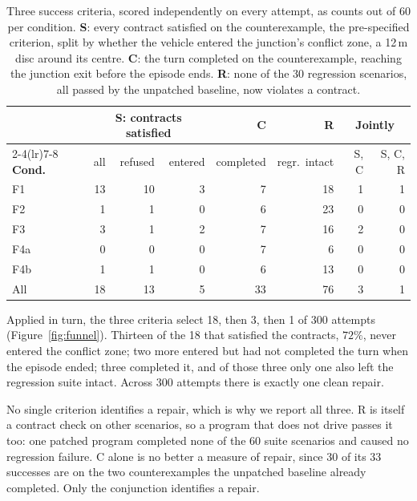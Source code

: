\documentclass{article}
\begin{document}
\begin{table}[t]
\centering
\small
\caption{Three success criteria, scored independently on every attempt, as
counts out of 60 per condition. \textbf{S}: every contract satisfied on the
counterexample, the pre-specified criterion, split by whether the vehicle
entered the junction's conflict zone, a 12\,m disc around its centre.
\textbf{C}: the turn completed on the counterexample, reaching the junction exit
before the episode ends. \textbf{R}: none of the 30 regression scenarios, all
passed by the unpatched baseline, now violates a contract.}
\label{tab:criteria}
\begin{tabular}{@{}lrrrrrrr@{}}
\toprule
& \multicolumn{3}{c}{\textbf{S: contracts satisfied}} & \textbf{C} & \textbf{R} & \multicolumn{2}{c}{\textbf{Jointly}} \\
\cmidrule(lr){2-4}\cmidrule(lr){7-8}
\textbf{Cond.} & all & refused & entered & completed & regr.\ intact & S, C & S, C, R \\
\midrule
F1  & 13 & 10 & 3 & 7 & 18 & 1 & 1 \\
F2  &  1 &  1 & 0 & 6 & 23 & 0 & 0 \\
F3  &  3 &  1 & 2 & 7 & 16 & 2 & 0 \\
F4a &  0 &  0 & 0 & 7 &  6 & 0 & 0 \\
F4b &  1 &  1 & 0 & 6 & 13 & 0 & 0 \\
\midrule
All & 18 & 13 & 5 & 33 & 76 & 3 & 1 \\
\bottomrule
\end{tabular}
\end{table}

Applied in turn, the three criteria select 18, then 3, then 1 of 300 attempts
(Figure~\ref{fig:funnel}).
Thirteen of the 18 that satisfied the contracts, $72\%$, never entered the
conflict zone; two more entered but had not completed the turn when the episode
ended; three completed it, and of those three only one also left the regression
suite intact. Across 300 attempts there is exactly one clean repair.

No single criterion identifies a repair, which is why we report all three. R
is itself a contract check on other scenarios, so a program that does not drive
passes it too: one patched program completed none of the 60 suite scenarios and
caused no regression failure. C alone is no better a measure of repair, since
30 of its 33 successes are on the two counterexamples the unpatched baseline
already completed. Only the conjunction identifies a repair.
\end{document}
